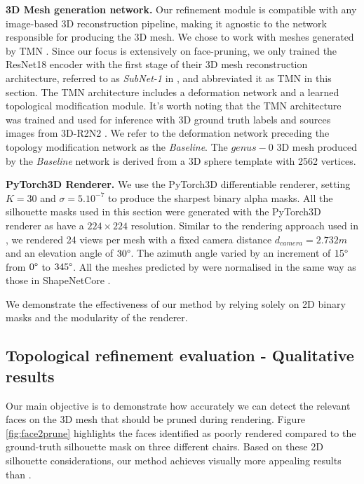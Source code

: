 \noindent\textbf{3D Mesh generation network.} Our refinement module is compatible with any image-based 3D reconstruction pipeline, making it agnostic to the network responsible for producing the 3D mesh. We chose to work with meshes generated by TMN \citep{pan2019deep}. Since our focus is extensively on face-pruning, we only trained the ResNet18 encoder with the first stage of their 3D mesh reconstruction architecture, referred to as \textit{SubNet-1} in \citep{pan2019deep}, and abbreviated it as TMN in this section. The TMN architecture includes a deformation network and a learned topological modification module. It's worth noting that the TMN architecture \citep{pan2019deep} was trained and used for inference with 3D ground truth labels and sources images from 3D-R2N2 \citep{choy20163d}. We refer to the deformation network preceding the topology modification network \citep{pan2019deep} as the \textit{Baseline}. The $genus-0$ 3D mesh produced by the \textit{Baseline} network is derived from a 3D sphere template with 2562 vertices.

\noindent\textbf{PyTorch3D Renderer.} We use the PyTorch3D \citep{nie2020total3dunderstanding} differentiable renderer, setting $K=30$ and $\sigma=5.10^{-7}$ to produce the sharpest binary alpha masks. All the silhouette masks used in this section were generated with the PyTorch3D renderer as have a $224\times 224$ resolution. Similar to the rendering approach used in \citep{choy20163d,liu2019soft,yan2016perspective}, we rendered 24 views per mesh with a fixed camera distance $d_{camera}=2.732m$ and an elevation angle of $30\degree$. The azimuth angle varied by an increment of $15\degree$ from $0\degree$ to $345\degree$. All the meshes predicted by \citep{pan2019deep} were normalised in the same way as those in ShapeNetCore \citep{chang2015shapenet}. 

We demonstrate the effectiveness of our method by relying solely on 2D binary masks and the modularity of the renderer. 

\subsection{Topological refinement evaluation - Qualitative results}

Our main objective is to demonstrate how accurately we can detect the relevant faces on the 3D mesh that should be pruned during rendering. Figure \ref{fig:face2prune} highlights the faces identified as poorly rendered compared to the ground-truth silhouette mask on three different chairs. Based on these 2D silhouette considerations, our method achieves visually more appealing results than \citep{pan2019deep}. 

